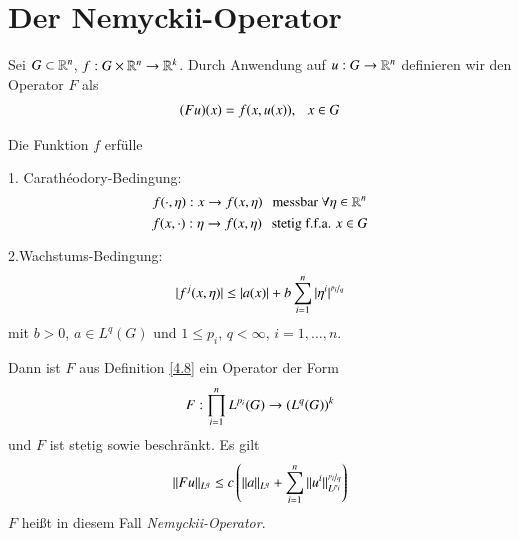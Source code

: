 \section{Der Nemyckii-Operator}

\begin{defi}\label{4.8}
    Sei $G\subset \mathbb{R}^n$, $f:G\times \mathbb{R}^n\rightarrow \mathbb{R}^k$. Durch Anwendung auf $u:G\rightarrow \mathbb{R}^n$ definieren
    wir den Operator $F$ als
    \begin{align}
        (Fu)(x)=f(x,u(x)), \hspace{.25cm} x\in G
    \end{align}
\end{defi}

\begin{lem}\label{4.9}
    Die Funktion $f$ erfülle
    \begin{description}
        \item{1. Carathéodory-Bedingung:}
        \[
            f(\cdot,\eta): x \rightarrow f(x,\eta) \hspace{.25cm} \text{messbar } \forall \eta\in \mathbb{R}^n
        \]
        \[
            f(x,\cdot):\eta\rightarrow f(x,\eta) \hspace{.25cm} \text{stetig f.f.a. } x\in G
        \]
        \item{2.Wachstums-Bedingung:}
        \[
            |f^j(x,\eta)|\leq |a(x)|+ b \sum_{i=1}^n|\eta^i|^{\nicefrac{p_i}{q}}
        \]
        mit $b>0$, $a\in L^q(G)$ und $1\leq p_i$, $q<\infty$, $i=1,…,n$. 
    \end{description}
    Dann ist $F$ aus Definition \ref{4.8} ein Operator der Form
    \[
        F:\prod_{i=1}^n L^{p_i}(G) \rightarrow (L^q(G))^k
    \]
    und $F$ ist stetig sowie beschränkt. Es gilt
    \[
        \|Fu\|_{L^q}\leq c\left( \|a\|_{L^q} + \sum_{i=1}^n \|u^i\|_{L^{p_i}}^{\nicefrac{p_i}{q}} \right)
    \]
    $F$ heißt in diesem Fall \textit{Nemyckii-Operator}.
\end{lem}

